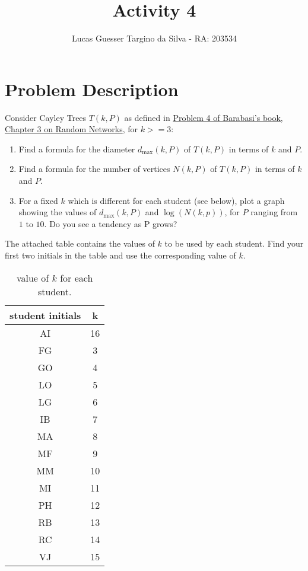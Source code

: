\documentclass{article}
\title{Activity 4}
\author{Lucas Guesser Targino da Silva - RA: 203534}
\begin{document}
\section{Problem Description}

Consider Cayley Trees $T(k, P)$ as defined in
\href{http://networksciencebook.com/chapter/3#homework3}{Problem 4 of Barabasi's book, Chapter 3 on Random Networks}, for $k >= 3$:

\begin{enumerate}
    \item Find a formula for the diameter $d_{\max}(k, P)$ of $T(k, P)$ in terms of $k$ and $P$.
    \item Find a formula for the number of vertices $N(k, P)$ of $T(k, P)$ in terms of $k$ and $P$.
    \item For a fixed $k$ which is different for each student (see below), plot a graph showing the values of $d_{\max}(k, P)$ and $\log(N(k, p))$, for $P$ ranging from $1$ to $10$.  Do you see a tendency as P grows?
\end{enumerate}

The attached table contains the values of $k$ to be used by each student.  Find your first two initials in the table and use the corresponding value of $k$.

\begin{table}[!ht]
    \centering
    \begin{tabular}{|c|c|}
        \hline
        student initials & k\\\hline\hline
        AI & 16 \\\hline
        FG & 3 \\\hline
        GO & 4 \\\hline
        LO & 5 \\\hline
        LG & 6 \\\hline
        IB & 7 \\\hline
        MA & 8 \\\hline
        MF & 9 \\\hline
        MM & 10 \\\hline
        MI & 11 \\\hline
        PH & 12 \\\hline
        RB & 13 \\\hline
        RC & 14 \\\hline
        VJ & 15 \\\hline
    \end{tabular}
    \caption{value of $k$ for each student.}
\end{table}
\end{document}
